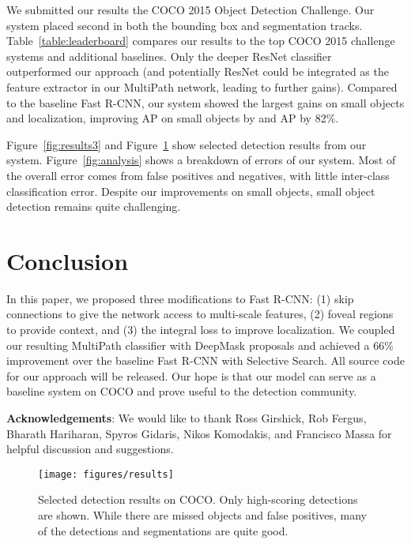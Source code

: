 \documentclass{bmvc2k}
\newcommand{\Caption}[1]{\caption{\small#1}}
\newcommand{\AP}[1]{AP\xspace}
\newcommand{\fig}[1]{Figure~\ref{fig:#1}}
\newcommand{\tab}[1]{Table~\ref{table:#1}}
\begin{document}
We submitted our results the COCO 2015 Object Detection Challenge. Our system placed second in both the bounding box and segmentation tracks. \tab{leaderboard} compares our results to the top COCO 2015 challenge systems and additional baselines. Only the deeper ResNet classifier~\cite{he2015deep} outperformed our approach (and potentially ResNet could be integrated as the feature extractor in our MultiPath network, leading to further gains). Compared to the baseline Fast R-CNN, our system showed the largest gains on small objects and localization, improving AP on small objects by  and \AP{75} by 82\%.

\fig{results3} and \fig{results} show selected detection results from our system. \fig{analysis} shows a breakdown of errors of our system. Most of the overall error comes from false positives and negatives, with little inter-class classification error. Despite our improvements on small objects, small object detection remains quite challenging.

\section{Conclusion}

In this paper, we proposed three modifications to Fast R-CNN: (1) skip connections to give the network access to multi-scale features, (2) foveal regions to provide context, and (3) the integral loss to improve localization. We coupled our resulting MultiPath classifier with DeepMask proposals and achieved a 66\% improvement over the baseline Fast R-CNN with Selective Search. All source code for our approach will be released. Our hope is that our model can serve as a baseline system on COCO and prove useful to the detection community.

{\vspace{2mm}\hspace{-1.5em}\small\textbf{Acknowledgements}: We would like to thank Ross Girshick, Rob Fergus, Bharath Hariharan, Spyros Gidaris, Nikos Komodakis, and Francisco Massa for helpful discussion and suggestions.}

\begin{figure}[t]\centering
 \texttt{[image: figures/results]}
\Caption{Selected detection results on COCO. Only high-scoring detections are shown. While there are missed objects and false positives, many of the detections and segmentations are quite good.}
\label{fig:results}
\end{figure}
\clearpage
\end{document}

